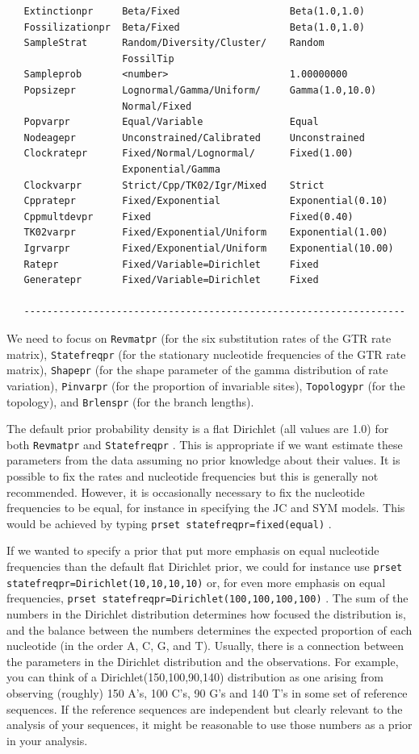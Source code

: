 \documentclass[12pt]{book}
\newcommand{\ttt}[1]{\texttt{#1} }
\begin{document}
\begin{singlespacing}
\begin{verbatim}
   Extinctionpr     Beta/Fixed                   Beta(1.0,1.0)
   Fossilizationpr  Beta/Fixed                   Beta(1.0,1.0)
   SampleStrat      Random/Diversity/Cluster/    Random
                    FossilTip
   Sampleprob       <number>                     1.00000000
   Popsizepr        Lognormal/Gamma/Uniform/     Gamma(1.0,10.0)
                    Normal/Fixed
   Popvarpr         Equal/Variable               Equal
   Nodeagepr        Unconstrained/Calibrated     Unconstrained
   Clockratepr      Fixed/Normal/Lognormal/      Fixed(1.00)
                    Exponential/Gamma
   Clockvarpr       Strict/Cpp/TK02/Igr/Mixed    Strict
   Cppratepr        Fixed/Exponential            Exponential(0.10)
   Cppmultdevpr     Fixed                        Fixed(0.40)
   TK02varpr        Fixed/Exponential/Uniform    Exponential(1.00)
   Igrvarpr         Fixed/Exponential/Uniform    Exponential(10.00)
   Ratepr           Fixed/Variable=Dirichlet     Fixed
   Generatepr       Fixed/Variable=Dirichlet     Fixed

   ------------------------------------------------------------------
\end{verbatim}
\normalsize
\end{singlespacing}

We need to focus on \ttt{Revmatpr} (for the six substitution rates of the GTR rate matrix),
\ttt{Statefreqpr} (for the stationary nucleotide frequencies of the GTR rate matrix),
\ttt{Shapepr} (for the shape parameter of the gamma distribution of rate variation),
\ttt{Pinvarpr} (for the proportion of invariable sites), \ttt{Topologypr} (for the topology),
and \ttt{Brlenspr} (for the branch lengths).

The default prior probability density is a flat Dirichlet (all values are 1.0) for both
\ttt{Revmatpr} and \ttt{Statefreqpr}. This is appropriate if we want estimate these
parameters from the data assuming no prior knowledge about their values. It is possible to fix the
rates and nucleotide frequencies but this is generally not recommended. However, it is occasionally
necessary to fix the nucleotide frequencies to be equal, for instance in specifying the JC and SYM
models. This would be achieved by typing \ttt{prset statefreqpr=fixed(equal)}.

If we wanted to specify a prior that put more emphasis on equal nucleotide
frequencies than the default flat Dirichlet prior, we could for instance use
\ttt{prset statefreqpr=Dirichlet(10,10,10,10)} or, for even more emphasis on
equal frequencies, \ttt{prset statefreqpr=Dirichlet(100,100,100,100)}. The
sum of the numbers in the Dirichlet distribution determines how focused the
distribution is, and the balance between the numbers determines the expected
proportion of each nucleotide (in the order A, C, G, and T). Usually, there is
a connection between the parameters in the Dirichlet distribution and the
observations. For example, you can think of a Dirichlet(150,100,90,140)
distribution as one arising from observing (roughly) 150 A's, 100 C's, 90 G's
and 140 T's in some set of reference sequences. If the reference sequences are
independent but clearly relevant to the analysis of your sequences, it might be
reasonable to use those numbers as a prior in your analysis. 
\end{document}
